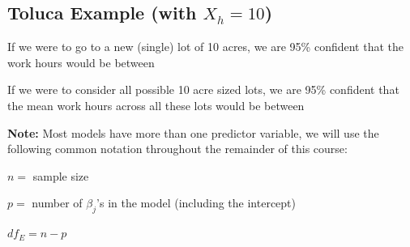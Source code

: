 \documentclass[12pt]{notes}
\begin{document}

\begin{minipage}[l][2cm][c]{\textwidth}
\end{minipage}

\subsection*{Toluca Example (with $X_h = 10$)}
\bi
\item If we were to go to a new (single) lot of 10 acres, we are 95\% confident that the work hours would be between 
 
 \begin{minipage}[l][2cm][c]{\textwidth}
\end{minipage}

\item If we were to consider all possible 10 acre sized lots, we are 95\% confident that the mean work hours across all these lots would be between  

 \begin{minipage}[l][2cm][c]{\textwidth}
\end{minipage}
\ei

\textbf{Note:} Most models have more than one predictor variable, we will use the following common notation throughout the remainder of this course:
\bi
\item $n =$ sample size
\item $p =$ number of $\beta_j$'s in the model (including the intercept)
\item $df_E = n-p$
\ei
















\end{document}
